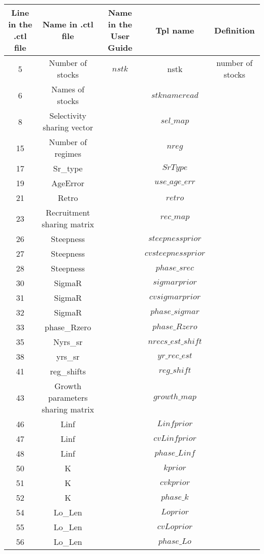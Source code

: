 \documentclass{article}
\begin{document}
\begin{tabular}{| c | c | c | c | c |}
\hline
Line in the .ctl file & Name in .ctl file  & Name in the User Guide & Tpl name & Definition\\ \hline
 5 &  Number of stocks & $nstk$  & nstk & number of stocks\\ \hline
6 &  Names of stocks &  & $stknameread$   & \\ \hline
8 &  Selectivity sharing vector &   & $sel\_map$ &\\ \hline
15 &  Number of regimes &   & $nreg$ &\\ \hline
17 &  Sr\_type &   & $SrType$ &\\ \hline
19 &  AgeError &   & $use\_age\_err$ &\\ \hline
21 &  Retro &   & $retro$ &\\ \hline
23 & Recruitment sharing matrix &   & $rec\_map$ &\\ \hline
26 &  Steepness &   & $steepnessprior$ &\\ \hline
27 &  Steepness &   & $cvsteepnessprior$ &\\ \hline
28 &  Steepness &   & $phase\_srec$ &\\ \hline
30 &  SigmaR &   & $sigmarprior$ &\\ \hline
31 &  SigmaR &   & $cvsigmarprior$ &\\ \hline
32 &  SigmaR &   & $phase\_sigmar$ &\\ \hline
33 &  phase\_Rzero &   & $phase\_Rzero$ &\\ \hline
35 &  Nyrs\_sr &   & $nrecs\_est\_shift$ &\\ \hline
38 &  yrs\_sr &   & $yr\_rec\_est$ &\\ \hline
41 &  reg\_shifts &   & $reg\_shift$ &\\ \hline
43 &  Growth parameters sharing matrix &   & $growth\_map$ &\\ \hline
46 &  Linf &   & $Linfprior$ &\\ \hline
47 &  Linf &   & $cvLinfprior$ &\\ \hline
48 &  Linf &   & $phase\_Linf$ &\\ \hline
50 &  K &   & $kprior$ &\\ \hline
51 & K &   & $cvkprior$ &\\ \hline
52 &  K &   & $phase\_k$ &\\ \hline
54 &  Lo\_Len &   & $Loprior$ &\\ \hline
55 &  Lo\_Len  &   & $cvLoprior$ &\\ \hline
56 &  Lo\_Len  &   & $phase\_Lo$ &\\ \hline

\end{tabular}
\end{document}
